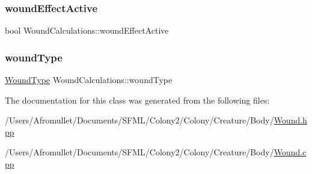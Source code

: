 \subsubsection{\texorpdfstring{wound\+Effect\+Active}{woundEffectActive}}
{\footnotesize\ttfamily bool Wound\+Calculations\+::wound\+Effect\+Active\hspace{0.3cm}{\ttfamily [private]}}

\mbox{\label{class_wound_calculations_acc032de2c8997651ef0ee68eeb5da8ff}} 
\subsubsection{\texorpdfstring{wound\+Type}{woundType}}
{\footnotesize\ttfamily \mbox{\hyperlink{_enum_types_8hpp_a585daaeecd1f9f1350c24bf0081a734e}{Wound\+Type}} Wound\+Calculations\+::wound\+Type\hspace{0.3cm}{\ttfamily [private]}}



The documentation for this class was generated from the following files\+:\begin{DoxyCompactItemize}
\item 
/\+Users/\+Afromullet/\+Documents/\+S\+F\+M\+L/\+Colony2/\+Colony/\+Creature/\+Body/\mbox{\hyperlink{_wound_8hpp}{Wound.\+hpp}}\item 
/\+Users/\+Afromullet/\+Documents/\+S\+F\+M\+L/\+Colony2/\+Colony/\+Creature/\+Body/\mbox{\hyperlink{_wound_8cpp}{Wound.\+cpp}}\end{DoxyCompactItemize}
